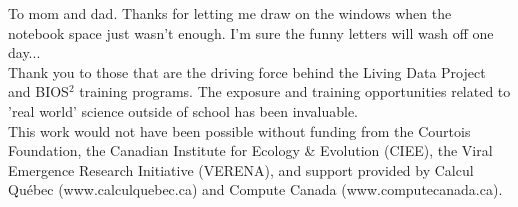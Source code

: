 \documentclass[12pt,twoside,phd]{dms}
\numberwithin{equation}{section}
\numberwithin{table}{chapter}
\numberwithin{figure}{chapter}
\begin{document}
To mom and dad. Thanks for letting me draw on the windows when the notebook space just wasn't enough. I'm sure the funny letters will wash off one day...\\

Thank you to those that are the driving force behind the Living Data Project and BIOS$^2$ training programs. The exposure and training opportunities related to 'real world' science outside of school has been invaluable.\\

This work would not have been possible without funding from the Courtois Foundation, the Canadian Institute for Ecology \& Evolution (CIEE), the Viral Emergence Research Initiative (VERENA), and support provided by Calcul Québec (www.calculquebec.ca) and Compute Canada (www.computecanada.ca).


\NoChapterPageNumber
\cleardoublepage
{}














\appendix



\end{document}
